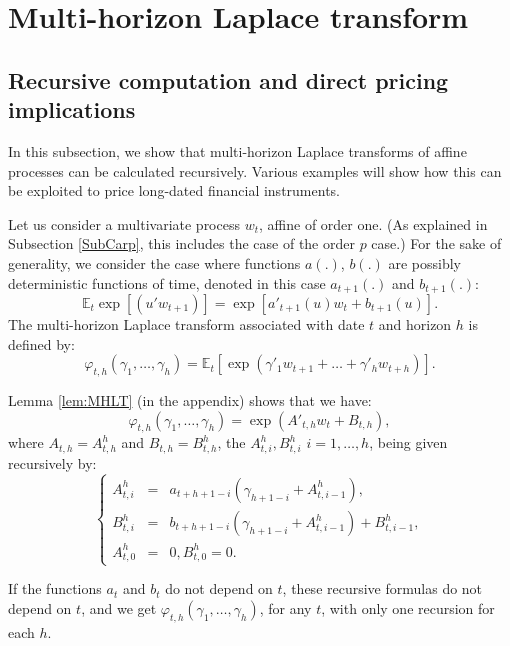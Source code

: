 \documentclass[
  12pt,
]{book}
\theoremstyle{definition}
\theoremstyle{definition}
\theoremstyle{definition}
\theoremstyle{definition}
\theoremstyle{remark}
\begin{document}
\hypertarget{MHLT}{%
\section{Multi-horizon Laplace transform}\label{MHLT}}

\hypertarget{recursive-computation-and-direct-pricing-implications}{%
\subsection{Recursive computation and direct pricing implications}\label{recursive-computation-and-direct-pricing-implications}}

In this subsection, we show that multi-horizon Laplace transforms of affine processes can be calculated recursively. Various examples will show how this can be exploited to price long-dated financial instruments.

Let us consider a multivariate process \(w_{t}\), affine of order one. (As explained in Subsection \ref{SubCarp}, this includes the case of the order \(p\) case.) For the sake of generality, we consider the case where functions \(a(.)\), \(b(.)\) are possibly deterministic functions of time, denoted in this case \(a_{t+1}(.)\) and \(b_{t+1}(.)\):
\[
\mathbb{E}_t \exp[(u'w_{t+1})] = \exp[a'_{t+1}(u)w_t+b_{t+1}(u)].
\]
The multi-horizon Laplace transform associated with date \(t\) and horizon \(h\) is defined by:
\begin{equation}
\varphi_{t,h}(\gamma_1,\dots,\gamma_h) = \mathbb{E}_t[\exp(\gamma'_1w_{t+1}+\dots+\gamma'_h w_{t+h})].\label{eq:multiLT}
\end{equation}

Lemma \ref{lem:MHLT} (in the appendix) shows that we have:
\[
\varphi_{t,h}(\gamma_1,\dots,\gamma_h) = \exp(A'_{t,h} w_t + B_{t,h}),
\]
where \(A_{t,h} = A^h_{t,h}\) and \(B_{t,h} = B^h_{t,h}\), the \(A^h_{t,i}, B^h_{t,i}\) \(i = 1,\dots,h\), being given recursively by:
\[
\left\{
\begin{array}{ccl}
A^h_{t,i} &=& a_{t+h+1-i}(\gamma_{h+1-i} + A^h_{t,i-1}), \\
B^h_{t,i} &=& b_{t+h+1-i}(\gamma_{h+1-i} + A^h_{t,i-1}) + B^h_{t,i-1}, \\
A^h_{t,0} &=& 0, B^h_{t,0} = 0.
\end{array}
\right.
\]

If the functions \(a_{t}\) and \(b_{t}\) do not depend on \(t\), these recursive formulas do not depend on \(t\), and we get \(\varphi_{t,h}(\gamma_1,\dots,\gamma_h)\), for any \(t\), with only one recursion for each \(h\).
\end{document}
